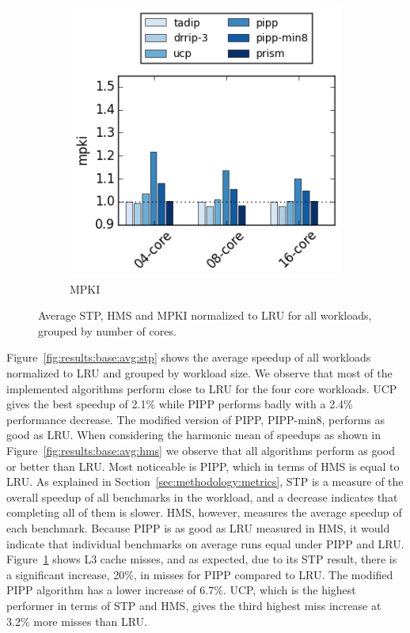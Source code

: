 \begin{figure}[t]
\begin{subfigure}[b]{0.3\textwidth}
        \includegraphics[width=.8\textwidth]{figures/results/avg-mpki-0128k-0100-avg}
        \caption{MPKI}
        \label{fig:results:base:avg:mpki}
    \end{subfigure}
    \caption[Average result grouped by core]{Average STP, HMS and MPKI normalized to LRU for all workloads, grouped by number of cores.}
    \label{fig:results:base:avg}
\end{figure}

Figure~\ref{fig:results:base:avg:stp} shows the average speedup of all workloads normalized to LRU and grouped by workload size.
We observe that most of the implemented algorithms perform close to LRU for the four core workloads.
UCP gives the best speedup of 2.1\% while PIPP performs badly with a 2.4\% performance decrease. 
The modified version of PIPP, PIPP-min8, performs as good as LRU.
When considering the harmonic mean of speedups as shown in Figure~\ref{fig:results:base:avg:hms} we observe that all algorithms perform as good or better than LRU.  
Most noticeable is PIPP, which in terms of HMS is equal to LRU.
As explained in Section~\ref{sec:methodology:metrics}, STP is a measure of the overall speedup of all benchmarks in the workload, and a decrease indicates that completing all of them is slower.
HMS, however, measures the average speedup of each benchmark.
Because PIPP is as good as LRU measured in HMS, it would indicate that individual benchmarks on average runs equal under PIPP and LRU.
Figure~\ref{fig:results:base:avg:mpki} shows L3 cache misses, and as expected, due to its STP result, there is a significant increase, 20\%, in misses for PIPP compared to LRU.
The modified PIPP algorithm has a lower increase of 6.7\%.
UCP, which is the highest performer in terms of STP and HMS, gives the third highest miss increase at 3.2\% more misses than LRU. 


